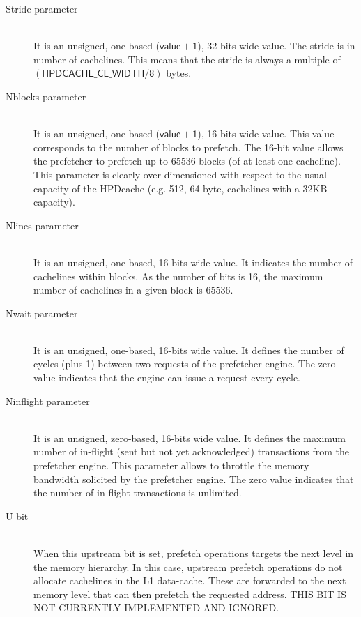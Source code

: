 \documentclass[10pt,titlepage,twoside]{book}
\begin{document}
\begin{description}

\item [\textsf{Stride} parameter] \mbox{}\\
It is an unsigned, one-based ($\mathsf{value + 1}$), 32-bits wide value.
The stride is in number of cachelines.
This means that the stride is always a multiple of $\mathsf{(HPDCACHE\_CL\_WIDTH/8)}$ bytes.

\item [\textsf{Nblocks} parameter] \mbox{}\\
It is an unsigned, one-based ($\mathsf{value + 1}$), 16-bits wide value.
This value corresponds to the number of blocks to prefetch.
The 16-bit value allows the prefetcher to prefetch up to 65536 blocks (of at least one cacheline).
This parameter is clearly over-dimensioned with respect to the usual capacity of the \ac{HPDcache} (e.g. 512, 64-byte, cachelines with a 32KB capacity).

\item [\textsf{Nlines} parameter] \mbox{}\\
It is an unsigned, one-based, 16-bits wide value.
It indicates the number of cachelines within blocks.
As the number of bits is 16, the maximum number of cachelines in a given block is 65536.

\item [\textsf{Nwait} parameter] \mbox{}\\
It is an unsigned, one-based, 16-bits wide value.
It defines the number of cycles (plus 1) between two requests of the prefetcher engine.
The zero value indicates that the engine can issue a request every cycle.

\item [\textsf{Ninflight} parameter] \mbox{}\\
It is an unsigned, zero-based, 16-bits wide value.
It defines the maximum number of in-flight (sent but not yet acknowledged) transactions from the prefetcher engine.
This parameter allows to throttle the memory bandwidth solicited by the prefetcher engine.
The zero value indicates that the number of in-flight transactions is unlimited.

\item [\textsf{U} bit] \mbox{}\\
When this upstream bit is set, prefetch operations targets the next level in the memory hierarchy.
In this case, upstream prefetch operations do not allocate cachelines in the L1 data-cache.
These are forwarded to the next memory level that can then prefetch the requested address.
THIS BIT IS NOT CURRENTLY IMPLEMENTED AND IGNORED.


\end{description}
\end{document}

